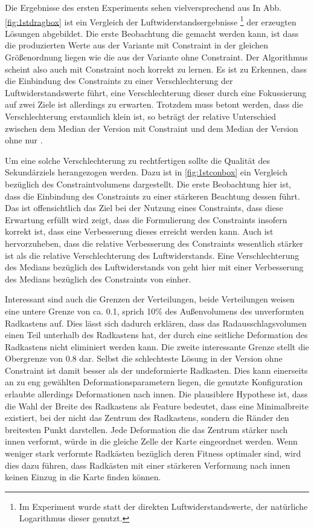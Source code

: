 Die Ergebnisse des ersten Experiments sehen vielversprechend aus In Abb. \ref{fig:1stdragbox} ist ein Vergleich der Luftwiderstandsergebnisse 
\footnote{Im Experiment wurde statt der direkten Luftwiderstandswerte, der natürliche Logarithmus dieser genutzt.} 
der erzeugten Lösungen abgebildet.
Die erste Beobachtung die gemacht werden kann, ist dass die produzierten Werte aus der Variante mit Constraint in der gleichen Größenordnung liegen wie die aus der Variante ohne Constraint.
Der Algorithmus scheint also auch mit Constraint noch korrekt zu lernen.
Es ist zu Erkennen, dass die Einbindung des Constraints zu einer Verschlechterung der Luftwiderstandswerte führt, eine Verschlechterung dieser durch eine Fokussierung auf zwei Ziele ist allerdings zu erwarten.
Trotzdem muss betont werden, dass die Verschlechterung erstaunlich klein ist, so beträgt der relative Unterschied zwischen dem Median der Version mit Constraint und dem Median der Version ohne nur .

Um eine solche Verschlechterung zu rechtfertigen sollte die Qualität des Sekundärziels herangezogen werden.
Dazu ist in \ref{fig:1stconbox} ein Vergleich bezüglich des Constraintvolumens dargestellt.
Die erste Beobachtung hier ist, dass die Einbindung des Constraints zu einer stärkeren Beachtung dessen führt.
Das ist offensichtlich das Ziel bei der Nutzung eines Constraints, dass diese Erwartung erfüllt wird zeigt, dass die Formulierung des Constraints insofern korrekt ist, dass eine Verbesserung dieses erreicht werden kann.
Auch ist hervorzuheben, dass die relative Verbesserung des Constraints wesentlich stärker ist als die relative Verschlechterung des Luftwiderstands.
Eine Verschlechterung des Medians bezüglich des Luftwiderstands von  geht hier mit einer Verbesserung des Medians bezüglich des Constraints von  einher.

Interessant sind auch die Grenzen der Verteilungen, beide Verteilungen weisen eine untere Grenze von ca. 0.1, sprich 10\% des Außenvolumens des unverformten Radkastens auf.
Dies lässt sich dadurch erklären, dass das Radausschlagsvolumen einen Teil unterhalb des Radkastens hat, der durch eine seitliche Deformation des Radkastens nicht eliminiert werden kann.
Die zweite interessante Grenze stellt die Obergrenze von 0.8 dar.
Selbst die schlechteste Lösung in der Version ohne Constraint ist damit besser als der undeformierte Radkasten.
Dies kann einerseits an zu eng gewählten Deformationsparametern liegen, die genutzte Konfiguration erlaubte allerdings Deformationen nach innen.
Die plausiblere Hypothese ist, dass die Wahl der Breite des Radkastens als Feature bedeutet, dass eine Minimalbreite existiert, bei der nicht das Zentrum des Radkastens, sondern die Ränder den breitesten Punkt darstellen.
Jede Deformation die das Zentrum stärker nach innen verformt, würde in die gleiche Zelle der Karte eingeordnet werden.
Wenn weniger stark verformte Radkästen bezüglich deren Fitness optimaler sind, wird dies dazu führen, dass Radkästen mit einer stärkeren Verformung nach innen keinen Einzug in die Karte finden können.

